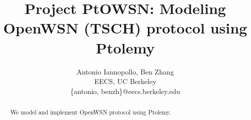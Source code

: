 \documentclass[10pt,twocolumn]{article}
\begin{document}
\title{Project PtOWSN: Modeling OpenWSN (TSCH) protocol using Ptolemy}

\author{
  Antonio Iannopollo, Ben Zhang\\
  EECS, UC Berkeley\\
  \{antonio, benzh\}@eecs.berkeley.edu
}

\maketitle
\thispagestyle{empty}

\begin{abstract}
We model and implement OpenWSN protocol using Ptolemy.
\end{abstract}





\end{document}
